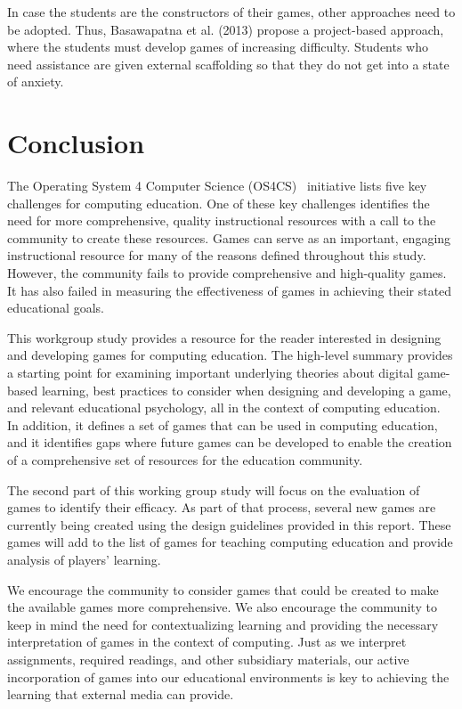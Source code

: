 \documentclass{sig-alternate-05-2015}
\begin{document}
In case the students are the constructors of their games, other approaches need to be adopted. Thus, Basawapatna et al. (2013) propose a project-based approach, where the students must develop games of increasing difficulty. Students who need assistance are given external scaffolding so that they do not get into a state of anxiety.\section{Conclusion}


The Operating System 4 Computer Science (OS4CS)~\cite{century13building} initiative lists five key challenges for computing education. One of these key challenges identifies the need for more comprehensive, quality instructional resources with a call to the community to create these resources. Games can serve as an important, engaging instructional resource for many of the reasons defined throughout this study. However, the community fails to provide comprehensive and high-quality games. It has also failed in measuring the effectiveness of games in achieving their stated educational goals.



This workgroup study provides a resource for the reader interested in designing and developing games for computing education. The high-level summary provides a starting point for examining important underlying theories about digital game-based learning, best practices to consider when designing and developing a game, and relevant educational psychology, all in the context of computing education. In addition, it defines a set of games that can be used in computing education, and it identifies gaps where future games can be developed to enable the creation of a comprehensive set of resources for the education community. 



The second part of this working group study will focus on the evaluation of games to identify their efficacy. As part of that process, several new games are currently being created using the design guidelines provided in this report. These games will add to the list of games for teaching computing education and provide analysis of players' learning.



We encourage the community to consider games that could be created to make the available games more comprehensive. We also encourage the community to keep in mind the need for contextualizing learning and providing the necessary interpretation of games in the context of computing. Just as we interpret assignments, required readings, and other subsidiary materials, our active incorporation of games into our educational environments is key to achieving the learning that external media can provide.







\end{document}
